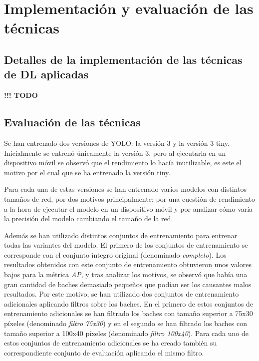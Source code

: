 \section{Implementación y evaluación de las técnicas}
\label{sec:implementacion_y_evaluacion_de_las_tecnicas}


\subsection{Detalles de la implementación de las técnicas de DL aplicadas}


{\color{red} \textbf{!!! TODO}}

\subsection{Evaluación de las técnicas}

Se han entrenado dos versiones de YOLO: la versión 3 y la versión 3 tiny. Inicialmente se entrenó únicamente la versión 3, pero al ejecutarla en un dispositivo móvil se observó que el rendimiento lo hacía inutilizable, es este el motivo por el cual que se ha entrenado la versión tiny.

Para cada una de estas versiones se han entrenado varios modelos con distintos tamaños de red, por dos motivos principalmente: por una cuestión de rendimiento a la hora de ejecutar el modelo en un dispositivo móvil y por analizar cómo varía la precisión del modelo cambiando el tamaño de la red.

Además se han utilizado distintos conjuntos de entrenamiento para entrenar todas las variantes del modelo. El primero de los conjuntos de entrenamiento se corresponde con el conjunto íntegro original (denominado \textit{completo}). Los resultados obtenidos con este conjunto de entrenamiento obtuvieron unos valores bajos para la métrica \textit{AP}, y tras analizar los motivos, se observó que había una gran cantidad de baches demasiado pequeños que podían ser los causantes malos resultados. Por este motivo, se han utilizado dos conjuntos de entrenamiento adicionales aplicando filtros sobre los baches. En el primero de estos conjuntos de entrenamiento adicionales se han filtrado los baches con tamaño superior a 75x30 píxeles (denominado \textit{filtro 75x30}) y en el segundo se han filtrado los baches con tamaño superior a 100x40 píxeles (denominado \textit{filtro 100x40}). Para cada uno de estos conjuntos de entrenamiento adicionales se ha creado también su correspondiente conjunto de evaluación aplicando el mismo filtro.

